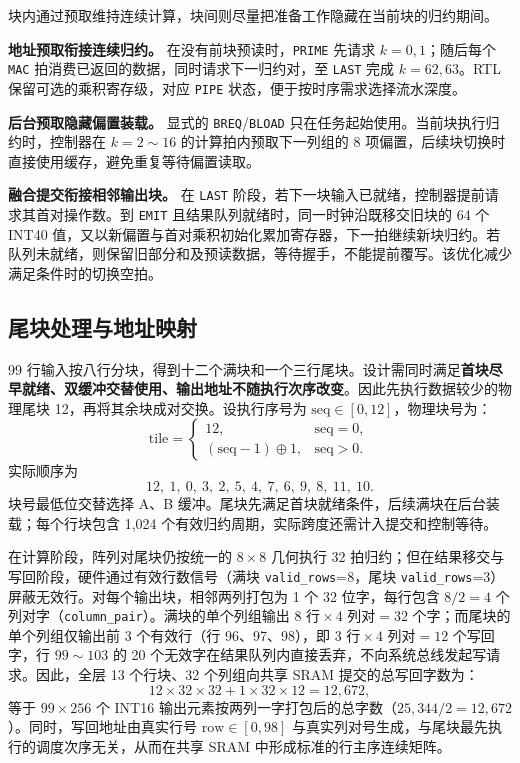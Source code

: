 \documentclass[UTF8,a4paper,zihao=-4,fontset=none,openany,oneside]{ctexrep}
\begin{document}
块内通过预取维持连续计算，块间则尽量把准备工作隐藏在当前块的归约期间。

\textbf{地址预取衔接连续归约。} 在没有前块预读时，\texttt{PRIME} 先请求 $k=0,1$；随后每个 \texttt{MAC} 拍消费已返回的数据，同时请求下一归约对，至 \texttt{LAST} 完成 $k=62,63$。RTL 保留可选的乘积寄存级，对应 \texttt{PIPE} 状态，便于按时序需求选择流水深度。

\textbf{后台预取隐藏偏置装载。} 显式的 \texttt{BREQ}/\texttt{BLOAD} 只在任务起始使用。当前块执行归约时，控制器在 $k=2\sim16$ 的计算拍内预取下一列组的 8 项偏置，后续块切换时直接使用缓存，避免重复等待偏置读取。

\textbf{融合提交衔接相邻输出块。} 在 \texttt{LAST} 阶段，若下一块输入已就绪，控制器提前请求其首对操作数。到 \texttt{EMIT} 且结果队列就绪时，同一时钟沿既移交旧块的 64 个 INT40 值，又以新偏置与首对乘积初始化累加寄存器，下一拍继续新块归约。若队列未就绪，则保留旧部分和及预读数据，等待握手，不能提前覆写。该优化减少满足条件时的切换空拍。

\subsection{尾块处理与地址映射}\label{sec:base-tail-tile}

99 行输入按八行分块，得到十二个满块和一个三行尾块。设计需同时满足\textbf{首块尽早就绪、双缓冲交替使用、输出地址不随执行次序改变}。因此先执行数据较少的物理尾块 12，再将其余块成对交换。设执行序号为 $\mathrm{seq}\in[0,12]$，物理块号为：
\begin{equation}
\label{eq:tail-mapping}
\mathrm{tile}=\begin{cases}12,&\mathrm{seq}=0,\\(\mathrm{seq}-1)\oplus1,&\mathrm{seq}>0.\end{cases}
\end{equation}
实际顺序为
\[
12,\ 1,\ 0,\ 3,\ 2,\ 5,\ 4,\ 7,\ 6,\ 9,\ 8,\ 11,\ 10.
\]
块号最低位交替选择 A、B 缓冲。尾块先满足首块就绪条件，后续满块在后台装载；每个行块包含 1,024 个有效归约周期，实际跨度还需计入提交和控制等待。


在计算阶段，阵列对尾块仍按统一的 $8\times8$ 几何执行 32 拍归约；但在结果移交与写回阶段，硬件通过有效行数信号（满块 \texttt{valid\_rows}=8，尾块 \texttt{valid\_rows}=3）屏蔽无效行。对每个输出块，相邻两列打包为 1 个 32 位字，每行包含 $8/2=4$ 个列对字（\texttt{column\_pair}）。满块的单个列组输出 $8\text{ 行}\times4\text{ 列对}=32$ 个字；而尾块的单个列组仅输出前 3 个有效行（行 96、97、98），即 $3\text{ 行}\times4\text{ 列对}=12$ 个写回字，行 $99\sim103$ 的 20 个无效字在结果队列内直接丢弃，不向系统总线发起写请求。因此，全层 13 个行块、32 个列组向共享 SRAM 提交的总写回字数为：
\begin{equation}
\label{eq:output-word-count}
12\times32\times32+1\times32\times12=12{,}672,
\end{equation}
等于 $99\times256$ 个 INT16 输出元素按两列一字打包后的总字数（$25{,}344/2=12{,}672$）。同时，写回地址由真实行号 $\text{row} \in [0,98]$ 与真实列对号生成，与尾块最先执行的调度次序无关，从而在共享 SRAM 中形成标准的行主序连续矩阵。
\end{document}
